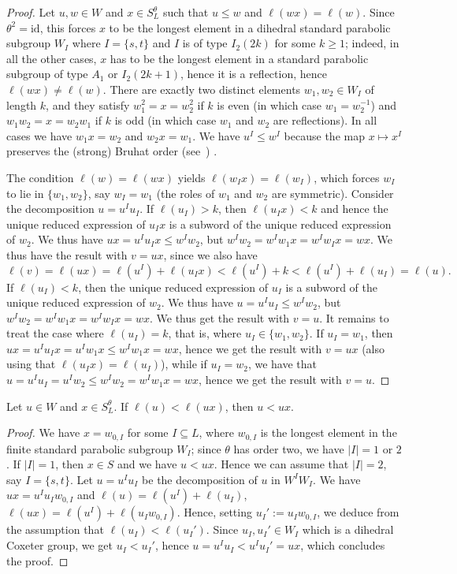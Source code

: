 \begin{proof}
	Let $u,w\in W$ and $x\in S_L^\theta$ such that $u\leq w$ and $\ell(wx)=\ell(w)$. Since $\theta^2=\mathrm{id}$, this forces $x$ to be the longest element in a dihedral standard parabolic subgroup $W_I$ where $I=\{s,t\}$ and $I$ is of type $I_2(2k)$ for some $k\geq 1$; indeed, in all the other cases, $x$ has to be the longest element in a standard parabolic subgroup of type $A_1$ or $I_2(2k+1)$, hence it is a reflection, hence $\ell(wx)\neq \ell(w)$. There are exactly two distinct elements $w_1, w_2\in W_I$ of length $k$, and they satisfy $w_1^2=x=w_2^2$ if $k$ is even (in which case $w_1=w_2^{-1}$) and $w_1 w_2=x=w_2 w_1$ if $k$ is odd (in which case $w_1$ and $w_2$ are reflections). In all cases we have $w_1 x=w_2$ and $w_2 x=w_1$. We have $u^I \leq w^I$ because the map $x \mapsto x^I$ preserves the (strong) Bruhat order (see~\cite[Proposition 2.5.1]{BB}) . 
	
	The condition $\ell(w)=\ell(wx)$ yields $\ell(w_I x)=\ell(w_I)$, which forces $w_I$ to lie in $\{w_1, w_2\}$, say $w_I=w_1$ (the roles of $w_1$ and $w_2$ are symmetric). Consider the decomposition $u=u^I u_I$. If $\ell(u_I)>k$, then $\ell(u_I x) < k$ and hence  the unique reduced expression of $u_I x$ is a subword of the unique reduced expression of $w_2$. We thus have $ux = u^I u_Ix \leq w^I w_2$, but $w^I w_2= w^I w_1x=w^I w_I x=wx$. We thus have the result with $v=ux$, since we also have $$\ell(v)=\ell(ux)= \ell(u^I)+\ell(u_I x)< \ell(u^I)+k<\ell(u^I)+\ell(u_I)=\ell(u).$$  
If $\ell(u_I)<k$, then the unique reduced expression of $u_I$ is a subword of the unique reduced expression of $w_2$. We thus have $u=u^I u_I \leq w^I w_2$, but $w^I w_2= w^I w_1 x=w^I w_I x=wx$. We thus get the result with $v=u$. It remains to treat the case where $\ell(u_I)=k$, that is, where $u_I\in \{w_1, w_2\}$. If $u_I=w_1$, then $ux= u^I u_I x= u^I w_1 x \leq w^I w_1 x =wx$, hence we get the result with $v=ux$ (also using that $\ell(u_Ix)=\ell(u_I)$), while if $u_I=w_2$, we have that $u=u^I u_I=u^I w_2 \leq w^I w_2=w^I w_1x=wx$, hence we get the result with $v=u$.
\end{proof}

\begin{lemma}\label{lem_long_gen}
	Let $u\in W$ and $x\in S_L^\theta$. If $\ell(u)< \ell(ux)$, then $u<ux$.
\end{lemma}

\begin{proof}
	We have $x=w_{0,I}$ for some $I\subseteq L$, where $w_{0,I}$ is the longest element in the finite standard parabolic subgroup $W_I$; since $\theta$ has order two, we have $|I|=1$ or $2$. If $|I|=1$, then $x\in S$ and we have $u < ux$. Hence we can assume that $|I|=2$, say $I=\{s,t\}$. Let $u=u^I u_I$ be the decomposition of $u$ in $W^I W_I$. We have $ux=u^I u_I w_{0,I}$ and $\ell(u)=\ell(u^I)+\ell(u_I)$, $\ell(ux)=\ell(u^I)+\ell(u_I w_{0,I})$. Hence, setting $u_I':=u_I w_{0,I}$, we deduce from the assumption that $\ell(u_I)<\ell(u_I')$. Since $u_I, u_I'\in W_I$ which is a dihedral Coxeter group, we get $u_I < u_I'$, hence $u=u^I u_I < u^I u_I'=ux$, which concludes the proof.
\end{proof}


